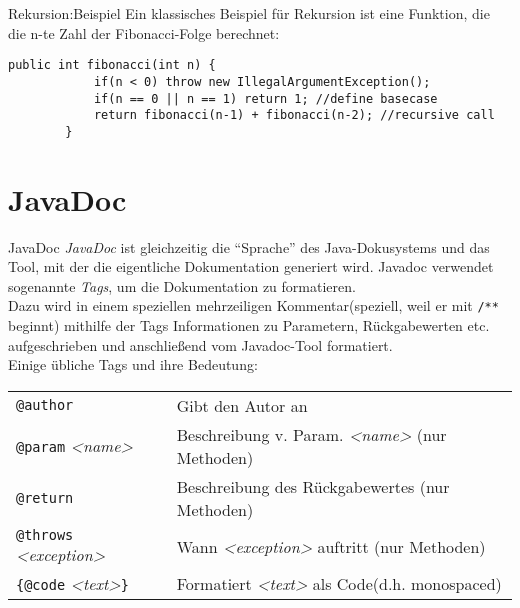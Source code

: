 \begin{frame}[fragile]{Rekursion:Beispiel}
    Ein klassisches Beispiel für Rekursion ist eine Funktion, die die n-te Zahl der Fibonacci-Folge berechnet:
    \begin{lstlisting}[gobble=8]
        public int fibonacci(int n) {
            if(n < 0) throw new IllegalArgumentException();
            if(n == 0 || n == 1) return 1; //define basecase
            return fibonacci(n-1) + fibonacci(n-2); //recursive call
        }
    \end{lstlisting}
\end{frame}

\section{JavaDoc}

\begin{frame}{JavaDoc}
    \onslide<+->
    \textit{JavaDoc} ist gleichzeitig die \enquote{Sprache} des Java-Dokusystems und das Tool, mit der die eigentliche Dokumentation generiert wird.
    Javadoc verwendet sogenannte \textit{Tags}, um die Dokumentation zu formatieren.\\
    \onslide<+->
    Dazu wird in einem speziellen mehrzeiligen Kommentar(speziell, weil er mit \texttt{/**} beginnt) mithilfe der Tags Informationen zu Parametern,
    Rückgabewerten etc. aufgeschrieben und anschließend vom Javadoc-Tool formatiert.\\
    \onslide<+->
    Einige übliche Tags und ihre Bedeutung:
    \begin{tabular}{l | l}
            \texttt{@author} & Gibt den Autor an \\
            \texttt{@param} \textit{<name>} & Beschreibung v. Param. \textit{<name>} (nur Methoden)\\
            \texttt{@return} & Beschreibung des Rückgabewertes (nur Methoden) \\
            \texttt{@throws} \textit{<exception>} & Wann \textit{<exception>} auftritt (nur Methoden)\\
            \texttt{\{@code} \textit{<text>}\texttt{\}} & Formatiert \textit{<text>} als Code(d.h. monospaced) \\
        \end{tabular}
\end{frame}


